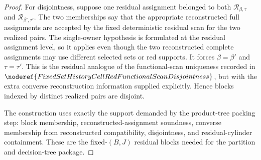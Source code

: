 \begin{proof}
For disjointness, suppose one residual assignment belonged to both
\(\mathcal R_{\beta,\tau}\) and \(\mathcal R_{\beta',\tau'}\).  The two
memberships say that the appropriate reconstructed full assignments are
accepted by the fixed deterministic residual scan for the two realized
pairs.  The single-owner hypothesis is formulated at the residual assignment
level, so it applies even though the two reconstructed complete assignments
may use different selected sets or red supports.  It forces
\(\beta=\beta'\) and \(\tau=\tau'\).  This is the residual analogue of the
functional-scan uniqueness recorded in
\(\noderef{FixedSetHistoryCellRedFunctionalScanDisjointness}\), but with the
extra converse reconstruction information supplied explicitly.  Hence
blocks indexed by distinct realized pairs are disjoint.

The construction uses exactly the support demanded by the product-tree
packing step: block membership, reconstructed-assignment soundness,
converse membership from reconstructed compatibility, disjointness, and
residual-cylinder containment.  These are the fixed-\((B,J)\) residual
blocks needed for the partition and decision-tree package.
\end{proof}
